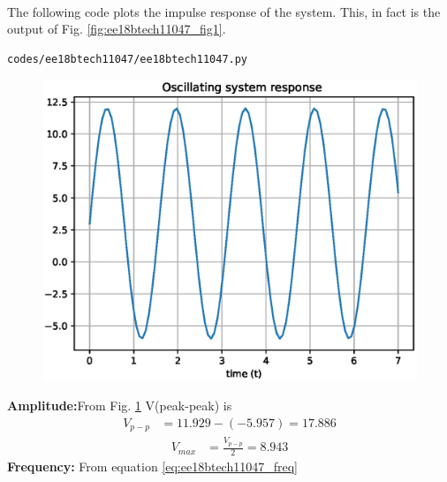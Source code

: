 \begin{enumerate}[label=\arabic*.,ref=\theenumi]
\begin{table}[!ht]
\end{table}
\\
\solution 
%
The following code plots the impulse  response of the system.  This, in fact is the output of Fig. \ref{fig:ee18btech11047_fig1}.
\begin{lstlisting}
codes/ee18btech11047/ee18btech11047.py
\end{lstlisting}
\begin{figure}[!ht]
\centering
\includegraphics[width=\columnwidth]{./figs/ee18btech11047/ee18btech11047.eps}
\caption{}
\label{fig:ee18btech11047_fig8}
\end{figure}
\textbf{Amplitude:}From Fig. \ref{fig:ee18btech11047_fig8} V(peak-peak) is 
\begin{align}
V_{p-p} &= 11.929-(-5.957)= 17.886
\end{align}
\begin{align}
V_{max} &= \frac{V_{p-p}}{2} = 8.943
\end{align}
\textbf{Frequency:} From equation \eqref{eq:ee18btech11047_freq}

\end{enumerate}
